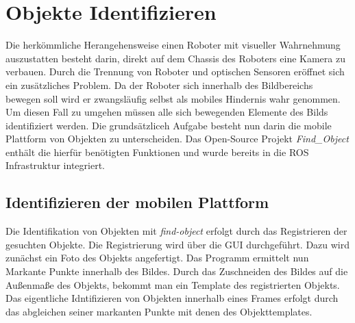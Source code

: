 \section{Objekte Identifizieren}
Die herkömmliche Herangehensweise einen Roboter mit visueller Wahrnehmung auszustatten besteht darin, direkt auf dem Chassis des Roboters eine Kamera zu verbauen. Durch die Trennung von Roboter und optischen Sensoren eröffnet sich ein zusätzliches Problem. Da der Roboter sich innerhalb des Bildbereichs bewegen soll wird er zwangsläufig selbst als mobiles Hindernis wahr genommen. Um diesen Fall zu umgehen müssen alle sich bewegenden Elemente des Bilds identifiziert werden. Die grundsätzliceh Aufgabe besteht nun darin die mobile Plattform von Objekten zu unterscheiden. Das Open-Source Projekt \textit{Find\_Object} enthält die hierfür benötigten Funktionen und wurde bereits in die ROS Infrastruktur integriert.

	\subsection{Identifizieren der mobilen Plattform}
	Die Identifikation von Objekten mit \textit{find-object} erfolgt durch das Registrieren der gesuchten Objekte. Die Registrierung wird über die GUI durchgeführt. Dazu wird zunächst ein Foto des Objekts angefertigt. Das Programm ermittelt nun Markante Punkte innerhalb des Bildes. Durch das Zuschneiden des Bildes auf die Außenmaße des Objekts, bekommt man ein Template des registrierten Objekts. Das eigentliche Idntifizieren von Objekten innerhalb eines Frames erfolgt durch das abgleichen seiner markanten Punkte mit denen des Objekttemplates.\newline
	
